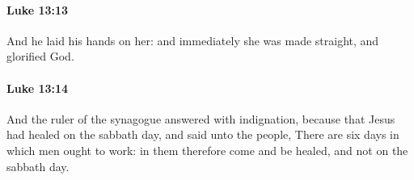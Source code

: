 		\paragraph{Luke 13:13} %
			\label{LUKE-13-13}

			And he laid his hands on her: and immediately she was made straight, and glorified God.

			\begin{framed}
			\scriptsize
				\begin{compactdesc}
					\item[SBLG] 
				\end{compactdesc}
			\end{framed}

		\paragraph{Luke 13:14} %
			\label{LUKE-13-14}

			And the ruler of the synagogue answered with indignation, because that Jesus had healed on the sabbath day, and said unto the people, There are six days in which men ought to work: in them therefore come and be healed, and not on the sabbath day.

